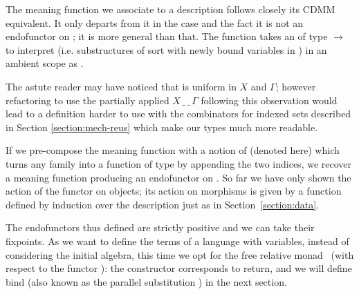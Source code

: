 \begin{agdasnippet}
\end{agdasnippet}

The meaning function  we associate to a description follows closely
its CDMM equivalent. It only departs from it in the  case and the fact
it is not an endofunctor on  ; it is more general than that.
The function takes an  of type {  $\rightarrow$  }
to interpret {  } (i.e. substructures of sort  with
newly bound variables in ) in an ambient scope  as {   }.

\begin{agdasnippet}
\end{agdasnippet}

The astute reader may have noticed that  is uniform in $X$ and $\Gamma$; however
refactoring  to use the partially applied $X\,\_\,\_\,\Gamma$ following
this observation would lead to a definition harder to use with the
combinators for indexed sets described in Section \ref{section:mech-reus}
which make our types much more readable.

If we pre-compose the meaning function  with a notion of 
(denoted  here) which turns any   family into a function
of type      by appending the two
 indices, we recover a meaning function producing an endofunctor on
 . So far we have only shown the action of the functor on objects;
its action on morphisms is given by a function  defined by induction over
the description just as in Section~\ref{section:data}.

\begin{agdasnippet}
\end{agdasnippet}

The endofunctors thus defined are strictly positive and we can take their fixpoints.
As we want to define the terms of a language with variables, instead of
considering the initial algebra, this time we opt for the free relative
monad~\cite{JFR4389} (with respect to the functor ): the 
constructor corresponds to return, and we will define bind (also known as
the parallel substitution ) in the next section.

